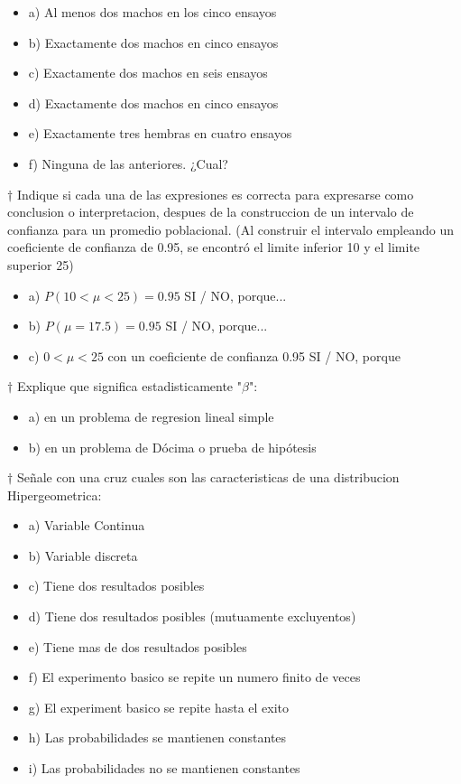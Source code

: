 \documentclass[10pt,a4paper]{article}
\begin{document}
\begin{itemize}
	\item a) Al menos dos machos en los cinco ensayos
	\item b) Exactamente dos machos en cinco ensayos
	\item c) Exactamente dos machos en seis ensayos
	\item d) Exactamente dos machos en cinco ensayos
	\item e) Exactamente tres hembras en cuatro ensayos
	\item f) Ninguna de las anteriores. ¿Cual?
\end{itemize}

$\dagger$ Indique si cada una de las expresiones es correcta para expresarse como conclusion o interpretacion, despues de la construccion de un intervalo de confianza para un promedio poblacional. (Al construir el intervalo empleando un coeficiente de confianza de 0.95, se encontró el limite inferior 10 y el limite superior 25)

\begin{itemize}
	\item a) $P(10<\mu <25) = 0.95$ SI / NO, porque...
	\item b) $P(\mu=17.5)=0.95$ SI / NO, porque...
	\item c) $0<\mu< 25$ con un coeficiente de confianza 0.95 SI / NO, porque
\end{itemize}

$\dagger$ Explique que significa estadisticamente "$\beta$":
\begin{itemize}
	\item a) en un problema de regresion lineal simple
	\item b) en un problema de Dócima o prueba de hipótesis
\end{itemize}

$\dagger$ Señale con una cruz cuales son las caracteristicas de una distribucion Hipergeometrica:
\begin{itemize}
	\item a) Variable Continua
	\item b) Variable discreta
	\item c) Tiene dos resultados posibles
	\item d) Tiene dos resultados posibles (mutuamente excluyentos)
	\item e) Tiene mas de dos resultados posibles
	\item f) El experimento basico se repite un numero finito de veces
	\item g) El experiment basico se repite hasta el exito
	\item h) Las probabilidades se mantienen constantes
	\item i) Las probabilidades no se mantienen constantes
\end{itemize}
\end{document}
